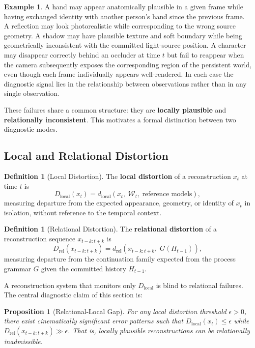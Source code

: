 \documentclass[11pt,a4paper]{article}
\theoremstyle{plain}
\newtheorem{proposition}[theorem]{Proposition}
\theoremstyle{definition}
\newtheorem{definition}[theorem]{Definition}
\newtheorem{example}[theorem]{Example}
\theoremstyle{remark}
\begin{document}
\begin{example}
A hand may appear anatomically plausible in a given frame while having exchanged identity with another person's hand since the previous frame. A reflection may look photorealistic while corresponding to the wrong source geometry. A shadow may have plausible texture and soft boundary while being geometrically inconsistent with the committed light-source position. A character may disappear correctly behind an occluder at time $t$ but fail to reappear when the camera subsequently exposes the corresponding region of the persistent world, even though each frame individually appears well-rendered. In each case the diagnostic signal lies in the relationship between observations rather than in any single observation.
\end{example}

These failures share a common structure: they are \textbf{locally plausible} and \textbf{relationally inconsistent}. This motivates a formal distinction between two diagnostic modes.

\subsection{Local and Relational Distortion}

\begin{definition}[Local Distortion]
The \textbf{local distortion} of a reconstruction $x_t$ at time $t$ is
\[
D_{\mathrm{local}}(x_t) = d_{\mathrm{local}}(x_t,\; \mathcal{W}_t,\; \text{reference models}),
\]
measuring departure from the expected appearance, geometry, or identity of $x_t$ in isolation, without reference to the temporal context.
\end{definition}

\begin{definition}[Relational Distortion]
The \textbf{relational distortion} of a reconstruction sequence $x_{t-k:t+k}$ is
\[
D_{\mathrm{rel}}(x_{t-k:t+k}) = d_{\mathrm{rel}}(x_{t-k:t+k},\; G(H_{t-1})),
\]
measuring departure from the continuation family expected from the process grammar $G$ given the committed history $H_{t-1}$.
\end{definition}

A reconstruction system that monitors only $D_{\mathrm{local}}$ is blind to relational failures. The central diagnostic claim of this section is:

\begin{proposition}[Relational-Local Gap]
\label{prop:rellocal}
For any local distortion threshold $\epsilon > 0$, there exist cinematically significant error patterns such that $D_{\mathrm{local}}(x_t) \leq \epsilon$ while $D_{\mathrm{rel}}(x_{t-k:t+k}) \gg \epsilon$. That is, locally plausible reconstructions can be relationally inadmissible.
\end{proposition}
\end{document}
